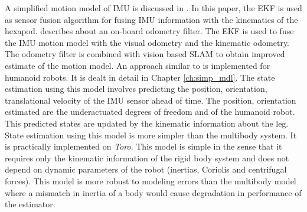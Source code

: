     A simplified motion model of IMU is discussed in \cite{bloe12}. In this paper, the EKF is used as sensor fusion algorithm for fusing IMU information with the kinematics of the hexapod. \citep{vis12} describes about an on-board odometry filter. The EKF is used to fuse the IMU motion model with the visual odometry and the kinematic odometry. The odometry filter is combined with vision based SLAM to obtain improved estimate of the motion model. An approach similar to \cite{bloe12} is implemented for humanoid robots. It is dealt in detail in Chapter \ref{ch:simp_mdl}. The state estimation using this model involves predicting the position, orientation, translational velocity of the IMU sensor ahead of time. The position, orientation estimated are the underactuated degrees of freedom and of the humanoid robot. This predicted states are updated by the kinematic information about the leg. State estimation using this model is more simpler than the multibody system. It is practically implemented on \emph{Toro}. This model is simple in the sense that it requires only the kinematic information of the rigid body system and does not depend on dynamic parameters of the robot (inertias, Coriolis and centrifugal forces). This model is more robust to modeling errors than the multibody model where a mismatch in inertia of a body would cause degradation in performance of the estimator.
